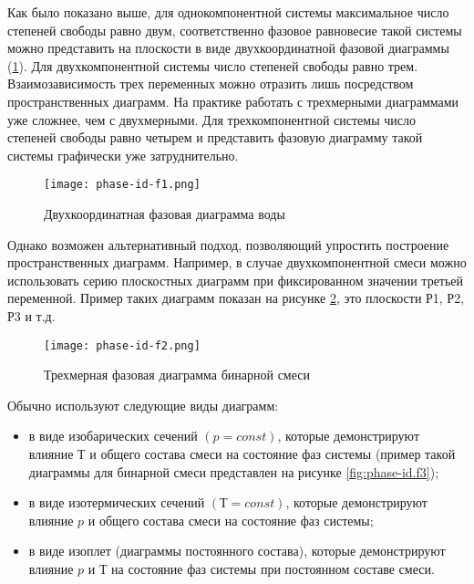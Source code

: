 Как было показано выше, для однокомпонентной системы максимальное число степеней свободы равно двум, соответственно фазовое равновесие такой системы можно представить на плоскости в виде двухкоординатной фазовой диаграммы (\cref{fig:phase-id.f1}). Для двухкомпонентной системы число степеней свободы равно трем. Взаимозависимость трех переменных можно отразить лишь посредством пространственных диаграмм. На практике работать с трехмерными диаграммами уже сложнее, чем с двухмерными. Для трехкомпонентной системы число степеней свободы равно четырем и представить фазовую диаграмму такой системы графически уже затруднительно.

\begin{figure}
	\begin{center}
		\texttt{[image: phase-id-f1.png]}
	\end{center}
	\caption{Двухкоординатная фазовая диаграмма воды} \label{fig:phase-id.f1}
\end{figure}

Однако возможен альтернативный подход, позволяющий упростить построение пространственных диаграмм. Например, в случае двухкомпонентной смеси можно использовать серию плоскостных диаграмм при фиксированном значении третьей переменной. Пример таких диаграмм показан на рисунке \cref{fig:phase-id.f2}, это плоскости Р1, Р2, Р3 и т.д.
\begin{figure}
	\begin{center}
		\texttt{[image: phase-id-f2.png]}
	\end{center}
	\caption{Трехмерная фазовая диаграмма бинарной смеси} \label{fig:phase-id.f2}
\end{figure}

Обычно используют следующие виды диаграмм:
\begin{itemize}
\item в виде изобарических сечений $(p = const)$, которые демонстрируют влияние $Т$ и общего состава смеси на состояние фаз системы (пример такой диаграммы для бинарной смеси представлен на рисунке \cref{fig:phase-id.f3}); 
\item в виде изотермических сечений $(Т = const)$, которые демонстрируют влияние $p$ и общего состава смеси на состояние фаз системы;
\item в виде изоплет (диаграммы постоянного состава), которые демонстрируют влияние $p$ и $Т$ на состояние фаз системы при постоянном составе смеси.	
\end{itemize} 

